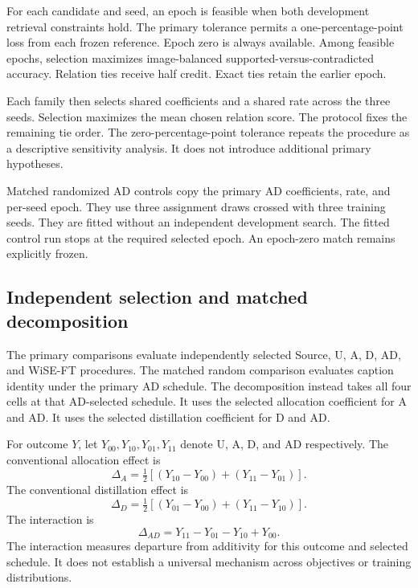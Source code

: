 For each candidate and seed, an epoch is feasible when both development retrieval constraints hold.
The primary tolerance permits a one-percentage-point loss from each frozen reference.
Epoch zero is always available.
Among feasible epochs, selection maximizes image-balanced supported-versus-contradicted accuracy.
Relation ties receive half credit.
Exact ties retain the earlier epoch.

Each family then selects shared coefficients and a shared rate across the three seeds.
Selection maximizes the mean chosen relation score.
The protocol fixes the remaining tie order.
The zero-percentage-point tolerance repeats the procedure as a descriptive sensitivity analysis.
It does not introduce additional primary hypotheses.

Matched randomized AD controls copy the primary AD coefficients, rate, and per-seed epoch.
They use three assignment draws crossed with three training seeds.
They are fitted without an independent development search.
The fitted control run stops at the required selected epoch.
An epoch-zero match remains explicitly frozen.

\subsection{Independent selection and matched decomposition}
The primary comparisons evaluate independently selected Source, U, A, D, AD, and WiSE-FT procedures.
The matched random comparison evaluates caption identity under the primary AD schedule.
The decomposition instead takes all four cells at that AD-selected schedule.
It uses the selected allocation coefficient for A and AD.
It uses the selected distillation coefficient for D and AD.

For outcome $Y$, let $Y_{00},Y_{10},Y_{01},Y_{11}$ denote U, A, D, and AD respectively.
The conventional allocation effect is
\begin{equation}
\Delta_A=\tfrac12[(Y_{10}-Y_{00})+(Y_{11}-Y_{01})].
\end{equation}
The conventional distillation effect is
\begin{equation}
\Delta_D=\tfrac12[(Y_{01}-Y_{00})+(Y_{11}-Y_{10})].
\end{equation}
The interaction is
\begin{equation}
\Delta_{AD}=Y_{11}-Y_{01}-Y_{10}+Y_{00}.
\end{equation}
The interaction measures departure from additivity for this outcome and selected schedule.
It does not establish a universal mechanism across objectives or training distributions.

